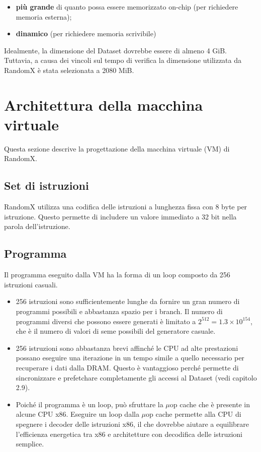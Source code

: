 \begin{itemize}
    \item \textbf{più grande} di quanto possa essere memorizzato on-chip (per richiedere memoria esterna);
    \item \textbf{dinamico} (per richiedere memoria scrivibile)
\end{itemize}

Idealmente, la dimensione del Dataset dovrebbe essere di almeno 4 GiB. Tuttavia, a causa dei vincoli sul tempo di verifica la dimensione utilizzata da RandomX è stata selezionata a 2080 MiB.

\section{Architettura della macchina virtuale}

Questa sezione descrive la progettazione della macchina virtuale (VM) di RandomX.

\subsection{Set di istruzioni}

RandomX utilizza una codifica delle istruzioni a lunghezza fissa con 8 byte per istruzione. Questo permette di includere un valore immediato a 32 bit nella parola dell'istruzione.

\subsection{Programma}

Il programma eseguito dalla VM ha la forma di un loop composto da 256 istruzioni casuali.

\begin{itemize}
  \item 256 istruzioni sono sufficientemente lunghe da fornire un gran numero di programmi possibili e abbastanza spazio per i branch. Il numero di programmi diversi che possono essere generati è limitato a $2^{512} = 1.3 \times 10^{154}$, che è il numero di valori di seme possibili del generatore casuale.
  \item 256 istruzioni sono abbastanza brevi affinché le CPU ad alte prestazioni possano eseguire una iterazione in un tempo simile a quello necessario per recuperare i dati dalla DRAM. Questo è vantaggioso perché permette di sincronizzare e prefetchare completamente gli accessi al Dataset (vedi capitolo 2.9).
  \item Poiché il programma è un loop, può sfruttare la $\mu$op cache che è presente in alcune CPU x86. Eseguire un loop dalla $\mu$op cache permette alla CPU di spegnere i decoder delle istruzioni x86, il che dovrebbe aiutare a equilibrare l'efficienza energetica tra x86 e architetture con decodifica delle istruzioni semplice.
\end{itemize}

